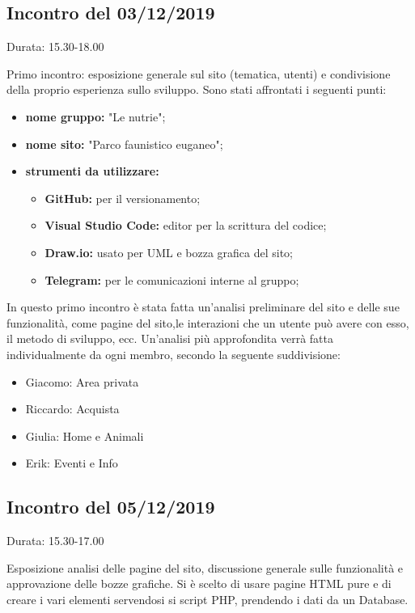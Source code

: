 \subsection{Incontro del 03/12/2019}
    Durata: 15.30-18.00

    Primo incontro: esposizione generale sul sito (tematica, utenti) e condivisione della proprio esperienza sullo sviluppo.
    Sono stati affrontati i seguenti punti:
    
    \begin{itemize}
        \item \textbf{nome gruppo:} "Le nutrie"; 
        \item \textbf{nome sito:} "Parco faunistico euganeo"; 
        \item \textbf{strumenti da utilizzare:}
            \begin{itemize}
                \item \textbf{GitHub:} per il versionamento; 
                \item \textbf{Visual Studio Code:} editor per la scrittura del codice; 
                \item \textbf{Draw.io:} usato per UML e bozza grafica del sito;
                \item \textbf{Telegram:} per le comunicazioni interne al gruppo;
            \end{itemize}
    \end{itemize}

    In questo primo incontro è stata fatta un'analisi preliminare del sito e delle sue funzionalità, come pagine del sito,le interazioni che un utente può avere con esso, il metodo di sviluppo, ecc.
    Un'analisi più approfondita verrà fatta individualmente da ogni membro, secondo la seguente suddivisione:
    \begin{itemize}
        \item Giacomo: Area privata
        \item Riccardo: Acquista
        \item Giulia: Home e Animali
        \item Erik: Eventi e Info
    \end{itemize}

\subsection{Incontro del 05/12/2019}
    Durata: 15.30-17.00

    Esposizione analisi delle pagine del sito, discussione generale sulle funzionalità e approvazione delle bozze grafiche.
    Si è scelto di usare pagine HTML pure e di creare i vari elementi servendosi si script PHP, prendendo i dati da un Database.

